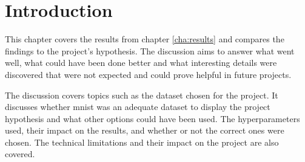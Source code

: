 \section{Introduction}\label{sec:discussion_introduction}
This chapter covers the results from chapter \autoref{cha:results} and compares the findings to the project's hypothesis. The discussion aims to answer what went well, what could have been done better and what interesting details were discovered that were not expected and could prove helpful in future projects.

The discussion covers topics such as the dataset chosen for the project. It discusses whether \gls{mnist} was an adequate dataset to display the project hypothesis and what other options could have been used. The hyperparameters used, their impact on the results, and whether or not the correct ones were chosen. The technical limitations and their impact on the project are also covered.







